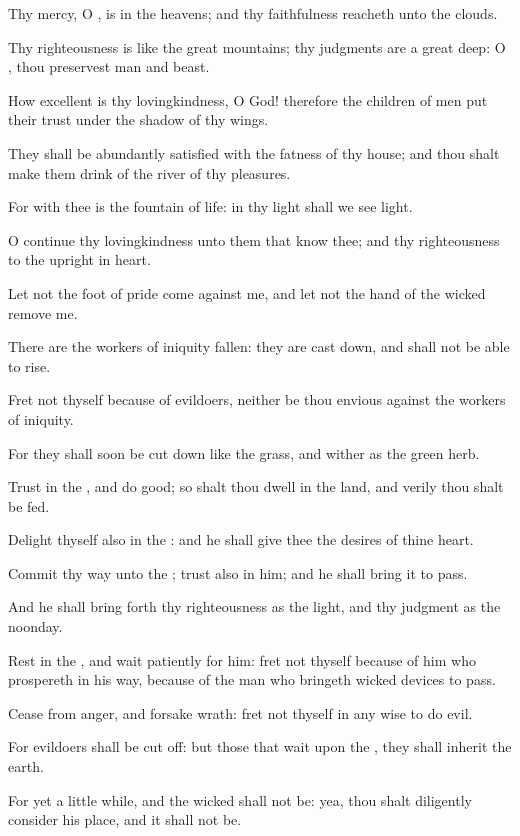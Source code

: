 \Verse Thy mercy, O \LORD, is in the heavens; and thy faithfulness reacheth unto the clouds.

\Verse Thy righteousness is like the great mountains; thy judgments are a great deep: O \LORD, thou preservest man and beast.

\Verse How excellent is thy lovingkindness, O God! therefore the children of men put their trust under the shadow of thy wings.

\Verse They shall be abundantly satisfied with the fatness of thy house; and thou shalt make them drink of the river of thy pleasures.

\Verse For with thee is the fountain of life: in thy light shall we see light.

\Verse O continue thy lovingkindness unto them that know thee; and thy righteousness to the upright in heart.

\Verse Let not the foot of pride come against me, and let not the hand of the wicked remove me.

\Verse There are the workers of iniquity fallen: they are cast down, and shall not be able to rise.




\Chapter
\Verse Fret not thyself because of evildoers, neither be thou envious against the workers of iniquity.

\Verse For they shall soon be cut down like the grass, and wither as the green herb.

\Verse Trust in the \LORD, and do good; so shalt thou dwell in the land, and verily thou shalt be fed.

\Verse Delight thyself also in the \LORD: and he shall give thee the desires of thine heart.

\Verse Commit thy way unto the \LORD; trust also in him; and he shall bring it to pass.

\Verse And he shall bring forth thy righteousness as the light, and thy judgment as the noonday.

\Verse Rest in the \LORD, and wait patiently for him: fret not thyself because of him who prospereth in his way, because of the man who bringeth wicked devices to pass.

\Verse Cease from anger, and forsake wrath: fret not thyself in any wise to do evil.

\Verse For evildoers shall be cut off: but those that wait upon the \LORD, they shall inherit the earth.

\Verse For yet a little while, and the wicked shall not be: yea, thou shalt diligently consider his place, and it shall not be.

